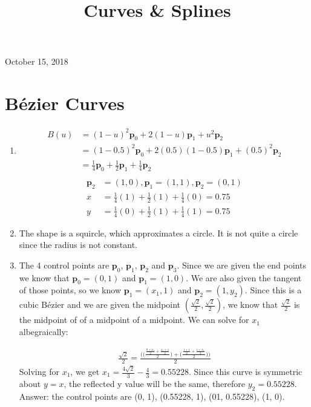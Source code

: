 \documentclass[12p]{article}
\title{Curves \& Splines}
\date{\vspace{-12ex}}
\theoremstyle{definition}
\begin{document}
\maketitle
\thispagestyle{fancy}

\onehalfspacing

\begin{center}
  October 15, 2018
\end{center}

\section{B\'ezier Curves}
\begin{enumerate}[label=\Alph*)]
  \item
  \begin{align*}
    B(u) &= (1 - u)^2 \textbf{p}_0 + 2 (1 - u) \textbf{p}_1 + u^2 \textbf{p}_2 \\
         &= (1 - 0.5)^2 \textbf{p}_0 + 2 (0.5)(1 - 0.5) \textbf{p}_1 + (0.5)^2 \textbf{p}_2 \\
         &= \frac{1}{4} \textbf{p}_0 + \frac{1}{2} \textbf{p}_1 + \frac{1}{4} \textbf{p}_2 \\
  \end{align*}
  \begin{align*}
    \textbf{p}_2 &= (1, 0), \textbf{p}_1 = (1, 1), \textbf{p}_2 = (0, 1) \\
    x &= \frac{1}{4} (1) + \frac{1}{2} (1) + \frac{1}{4} (0) = 0.75 \\
    y &= \frac{1}{4} (0) + \frac{1}{2} (1) + \frac{1}{4} (1) = 0.75
  \end{align*}
  \item The shape is a squircle, which approximates a circle. It is not quite a
  circle since the radius is not constant.
  \item
  The 4 control points are $\textbf{p}_0$, $\textbf{p}_1$, $\textbf{p}_2$ and $\textbf{p}_3$. Since we are
  given the end points we know that $\textbf{p}_0 = (0, 1)$ and $\textbf{p}_1 = (1, 0)$. We are
  also given the tangent of those points, so we know $\textbf{p}_1 = (x_1, 1)$ and $\textbf{p}_2 =
  (1, y_2)$. Since this is a cubic B\'ezier and we are given the midpoint
  $(\frac{\sqrt{2}}{2}, \frac{\sqrt{2}}{2})$, we know that $\frac{\sqrt{2}}{2}$
  is the midpoint of of a midpoint of a midpoint. We can solve for $x_1$ albegraically:

  \begin{align*}
    \frac{\sqrt{2}}{2} = \frac{\Bigg(\bigg(\frac{\frac{0+x_1}{2} + \frac{x_1 + 1}{2}}{2}\bigg) + \bigg(\frac{\frac{1+1}{2} + \frac{1 + x_1}{2}}{2}\bigg)\Bigg)}{2}
  \end{align*}
  Solving for $x_1$, we get $x_1 = \frac{4\sqrt{2}}{3} - \frac{4}{3} = 0.55228$. Since this curve is symmetric about $y = x$, the reflected y value will be the same, therefore $y_2 = 0.55228$. Answer: the control points are (0, 1), (0.55228, 1), (01, 0.55228), (1, 0).




\end{enumerate}
\end{document}
